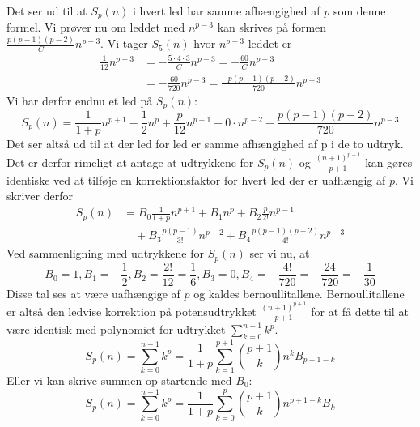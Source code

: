 Det ser ud til at \(S_{p}(n)\) i hvert led har samme afhængighed af \(p\) som denne formel. Vi prøver nu om leddet med \(n^{p-3}\) kan skrives på formen \(\frac{p(p-1)(p-2)}{C}n^{p-3}\). 
Vi tager \(S_{5}(n)\) hvor \(n^{p-3}\) leddet er 
\begin{align*}
\frac{1}{12}n^{p-3}&=-\frac{5 \cdot 4 \cdot 3}{C}n^{p-3}=- \frac{60}{C}n^{p-3}\\
&=-\frac{60}{720}n^{p-3}=\frac{-p(p-1)(p-2)}{720}n^{p-3}
\end{align*}
Vi har derfor endnu et led på \(S_{p}(n)\):
\[S_{p}(n)=\frac{1}{1+p}n^{p+1}-\frac{1}{2}n^{p}+\frac{p}{12}n^{p-1}+0 \cdot n^{p-2}-\frac{p(p-1)(p-2)}{720}n^{p-3}\] 
Det ser altså ud til at der led for led er samme afhængighed af p i de to udtryk. Det er derfor rimeligt at antage at udtrykkene for  \(S_{p}(n)\) og  \(\frac{(n+1)^{p+1}}{p+1}\) kan gøres identiske ved at tilføje en korrektionsfaktor for hvert led der er uafhængig af \(p\). Vi skriver derfor
\begin{align*}
S_{p}(n)&=B_{0}\frac{1}{1+p}n^{p+1}+B_{1}n^{p}+B_{2}\frac{p}{2!}n^{p-1}\\
&\quad +B_{3}\frac{p(p-1)}{3!}n^{p-2}+B_{4}\frac{p(p-1)(p-2)}{4!}n^{p-3}
\end{align*}
 Ved sammenligning med udtrykkene for \(S_{p}(n)\) ser vi nu, at 
\[B_{0}=1, B_{1}=-\frac{1}{2}, B_{2}=\frac{2!}{12}=\frac{1}{6}, B_{3}=0, B_{4}=-\frac{4!}{720}=-\frac{24}{720}=-\frac{1}{30}\]
Disse tal ses at være uafhængige af \(p\) og kaldes bernoullitallene. Bernoullitallene er altså den ledvise korrektion på potensudtrykket \(\frac{(n+1)^{p+1}}{p+1}\) for at få dette til at være identisk med polynomiet for udtrykket \(\sum_{k=0}^{n-1}k^{p}\).
\[S_{p}(n)=\sum_{k=0}^{n-1}k^{p}=\frac{1}{1+p}\sum_{k=1}^{p+1}\binom{p+1}{k}n^{k}B_{p+1-k}\]
Eller vi kan skrive summen op startende med \(B_{0}\):
\[S_{p}(n)=\sum_{k=0}^{n-1}k^{p}=\frac{1}{1+p}\sum_{k=0}^{p}\binom{p+1}{k}n^{p+1-k}B_{k}\]
